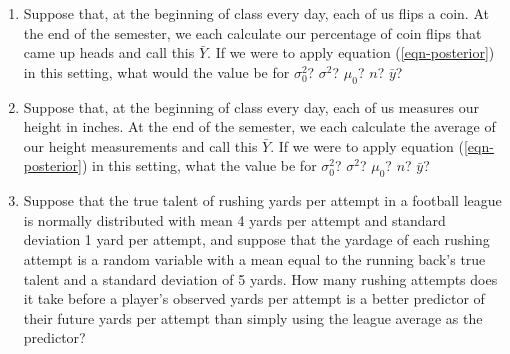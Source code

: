 \documentclass{article}
\begin{document}
    \begin{enumerate}
      \item Suppose that, at the beginning of class every day, each of us flips a coin. At the end of the semester, we each calculate our percentage of coin flips that came up heads and call this $\bar Y$. If we were to apply equation (\ref{eqn-posterior}) in this setting, what would the value be for $\sigma^2_0$? $\sigma^2$? $\mu_0$? $n$? $\bar y$?
      \item Suppose that, at the beginning of class every day, each of us measures our height in inches. At the end of the semester, we each calculate the average of our height measurements and call this $\bar Y$. If we were to apply equation (\ref{eqn-posterior}) in this setting, what the value be for $\sigma^2_0$? $\sigma^2$? $\mu_0$? $n$? $\bar y$?
      \item Suppose that the true talent of rushing yards per attempt in a football league is normally distributed with mean 4 yards per attempt and standard deviation 1 yard per attempt, and suppose that the yardage of each rushing attempt is a random variable with a mean equal to the running back's true talent and a standard deviation of 5 yards. How many rushing attempts does it take before a player's observed yards per attempt is a better predictor of their future yards per attempt than simply using the league average as the predictor?
    \end{enumerate}
\end{document}
